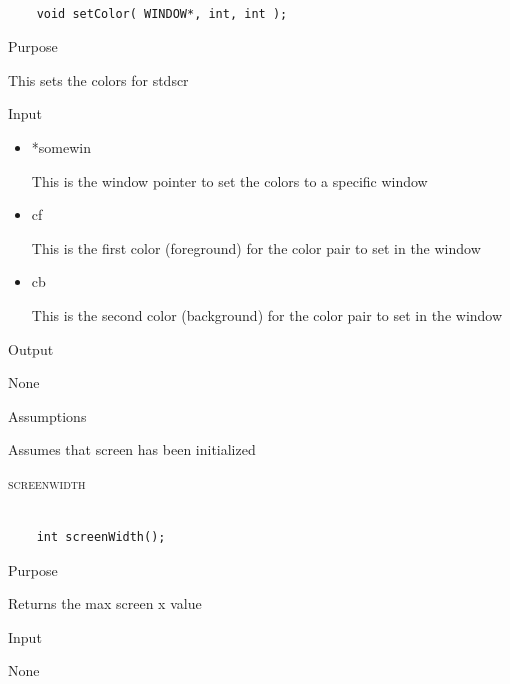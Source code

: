 \documentclass[pdftex, 11pt]{article}
\begin{document}
\begin{description}
		\begin{lstlisting}

	void setColor( WINDOW*, int, int );
		\end{lstlisting}

		\begin{description}
			\item{Purpose}

				This sets the colors for stdscr

			\item{Input}

				\begin{itemize}

					\item{*somewin}

						This is the window pointer to set
						the colors to a specific window

					\item{cf}

						This is the first color (foreground)
						for the color pair to set in the window

					\item{cb}

						This is the second color (background)
						for the color pair to set in the window
						
				\end{itemize}	

			\item{Output}

				None

			\item{Assumptions}

				Assumes that screen has been initialized

		\end{description}


	\item{\textsc{screenwidth}}

		\begin{lstlisting}

	int screenWidth();
		\end{lstlisting}

		\begin{description}
			\item{Purpose}

				Returns the max screen x value 

			\item{Input}

				None


\end{description}
\end{description}
\end{document}
